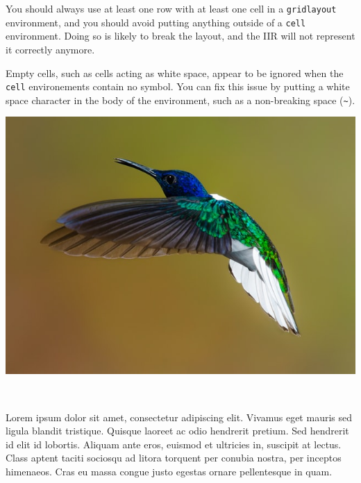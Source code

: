 \documentclass[11pt, a4paper]{article}
\begin{document}
\begin{warning}
    You should always use at least one row with at least one cell in a \texttt{gridlayout} environment, and you should avoid putting anything outside of a \texttt{cell} environment.
    Doing so is likely to break the layout, and the IIR will not represent it correctly anymore.
\end{warning}

\begin{warning}
    Empty cells, such as cells acting as white space, appear to be ignored when the \texttt{cell} environements contain no symbol.
    You can fix this issue by putting a white space character in the body of the environment, such as a non-breaking space (\verb|~|).
\end{warning}

\begin{example}
    \begin{gridlayout}{\textwidth}{11cm}
        \begin{row}{0.65}
            \begin{cell}{0.65}
                \includegraphics[width=\cellwidth]{img/bird.jpg}
            \end{cell}
            \begin{cell}{0.05}
                ~
            \end{cell}
            \begin{cell}{0.3}
                Lorem ipsum dolor sit amet, consectetur adipiscing elit. Vivamus eget mauris sed ligula blandit tristique. Quisque laoreet ac odio hendrerit pretium. Sed hendrerit id elit id lobortis. Aliquam ante eros, euismod et ultricies in, suscipit at lectus. Class aptent taciti sociosqu ad litora torquent per conubia nostra, per inceptos himenaeos. Cras eu massa congue justo egestas ornare pellentesque in quam.

\end{cell}
\end{row}
\end{gridlayout}
\end{example}
\end{document}

